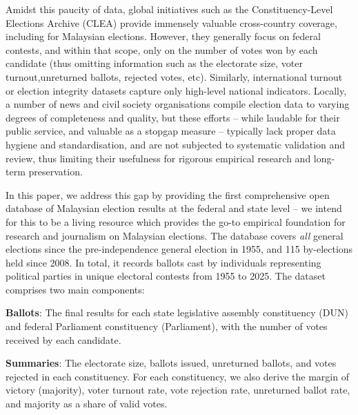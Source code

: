 \documentclass[11pt]{article}
\begin{document}
Amidst this paucity of data, global initiatives such as the Constituency-Level Elections Archive (CLEA)\cite{clea} provide immensely valuable cross-country coverage, including for Malaysian elections. However, they generally focus on federal contests, and within that scope, only on the number of votes won by each candidate (thus omitting information such as the electorate size, voter turnout,unreturned ballots, rejected votes, etc). Similarly, international turnout or election integrity datasets\cite{icoma2023urnout,norris2014integrity} capture only high-level national indicators. Locally, a number of news and civil society organisations\cite{undiinfo,ge15sinar,tindakgithub} compile election data to varying degrees of completeness and quality, but these efforts -- while laudable for their public service, and valuable as a stopgap measure -- typically lack proper data hygiene and standardisation, and are not subjected to systematic validation and review, thus limiting their usefulness for rigorous empirical research and long-term preservation.

In this paper, we address this gap by providing the first comprehensive open database of Malaysian election results at the federal and state level -- we intend for this to be a living resource which provides the go-to empirical foundation for research and journalism on Malaysian elections. The database covers \textit{all} general elections since the pre-independence general election in 1955, and 115 by-elections held since 2008. In total, it records \TOTALBALLOTS\space ballots cast by \TOTALPARTIES\space individuals representing \TOTALPARTIES\space political parties in \TOTALCONTESTS\space unique electoral contests from 1955 to 2025. The dataset comprises two main components:
\begin{enumbul}
\item \textbf{Ballots}: The final results for each state legislative assembly constituency (DUN) and federal Parliament constituency (Parliament), with the number of votes received by each candidate.
\item \textbf{Summaries}: The electorate size, ballots issued, unreturned ballots, and votes rejected in each constituency. For each constituency, we also derive the margin of victory (majority), voter turnout rate, vote rejection rate, unreturned ballot rate, and majority as a share of valid votes.
\end{enumbul}
\end{document}
